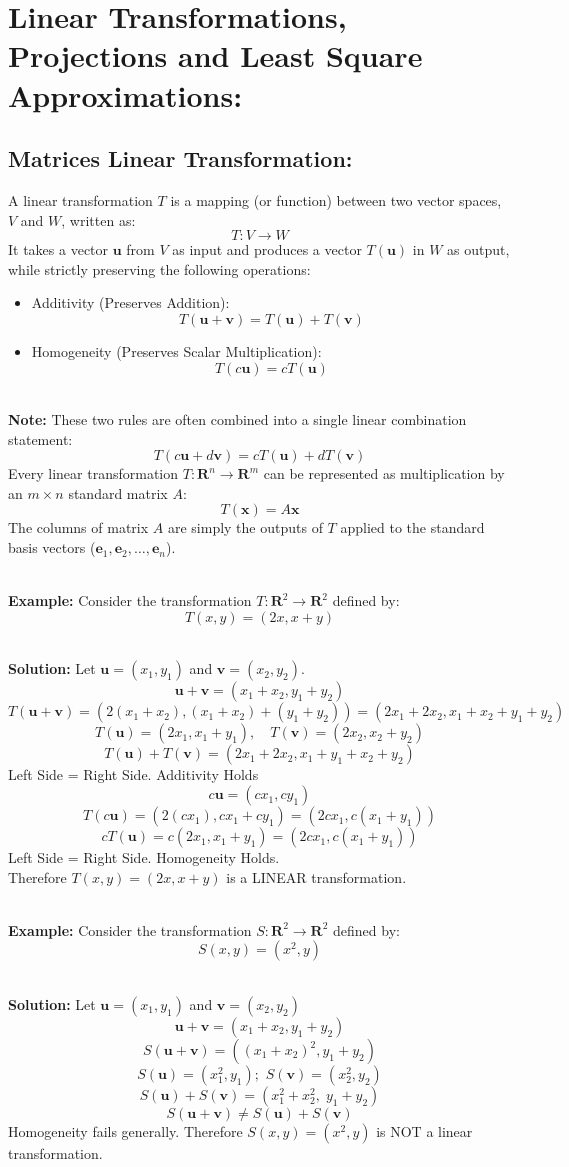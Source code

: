 \documentclass[DIV=20,oneside]{scrartcl}
\newcommand{\note}{
	\noindent\textbf{\\Note: }
}
\newcommand{\solution}{
	\noindent\textbf{\\Solution: }
}
\newcommand{\example}{
	\noindent\textbf{\\Example: }
}
\begin{document}
\section{Linear Transformations, Projections and Least Square Approximations:}
\subsection{Matrices Linear Transformation:} A linear transformation $T$ is a mapping (or function) between two vector spaces, $V$ and $W$, written as:$$T: V \to W$$It takes a vector $\mathbf{u}$ from $V$ as input and produces a vector $T(\mathbf{u})$ in $W$ as output, while strictly preserving the following operations:
\begin{itemize}
	\item Additivity (Preserves Addition):$$T(\mathbf{u} + \mathbf{v}) = T(\mathbf{u}) + T(\mathbf{v})$$
	\item Homogeneity (Preserves Scalar Multiplication):$$T(c\mathbf{u}) = cT(\mathbf{u})$$
\end{itemize}
\note These two rules are often combined into a single linear combination statement:$$T(c\mathbf{u} + d\mathbf{v}) = cT(\mathbf{u}) + dT(\mathbf{v})$$
Every linear transformation $T: \mathbf{R}^n \to \mathbf{R}^m$ can be represented as multiplication by an $m \times n$ standard matrix $A$:$$T(\mathbf{x}) = A\mathbf{x}$$The columns of matrix $A$ are simply the outputs of $T$ applied to the standard basis vectors ($\mathbf{e}_1, \mathbf{e}_2, \dots, \mathbf{e}_n$).

\example Consider the transformation $T: \mathbf{R}^2 \to \mathbf{R}^2$ defined by:$$T(x, y) = (2x, x + y)$$
\solution Let $\mathbf{u} = (x_1, y_1)$ and $\mathbf{v} = (x_2, y_2)$.
$$\mathbf{u} + \mathbf{v} = (x_1 + x_2, y_1 + y_2)$$
$$T(\mathbf{u} + \mathbf{v}) = (2(x_1 + x_2), (x_1 + x_2) + (y_1 + y_2)) = (2x_1 + 2x_2, x_1 + x_2 + y_1 + y_2)$$
$$T(\mathbf{u}) = (2x_1, x_1 + y_1), \quad T(\mathbf{v}) = (2x_2, x_2 + y_2)$$
$$T(\mathbf{u}) + T(\mathbf{v}) = (2x_1 + 2x_2, x_1 + y_1 + x_2 + y_2)$$
Left Side = Right Side. Additivity Holds
$$c\mathbf{u} = (cx_1, cy_1)$$
$$T(c\mathbf{u}) = (2(cx_1), cx_1 + cy_1) = (2cx_1, c(x_1 + y_1))$$
$$cT(\mathbf{u}) = c(2x_1, x_1 + y_1) = (2cx_1, c(x_1 + y_1))$$
Left Side = Right Side. Homogeneity Holds.\\
Therefore $T(x, y) = (2x, x + y)$ is a LINEAR transformation.

\example Consider the transformation $S: \mathbf{R}^2 \to \mathbf{R}^2$ defined by:$$S(x, y) = (x^2, y)$$
\solution Let $\mathbf{u} = (x_1, y_1)$ and $\mathbf{v} = (x_2, y_2)$ 
$$\mathbf{u} + \mathbf{v} = (x_1 + x_2, y_1 + y_2)$$
$$S(\mathbf{u} + \mathbf{v}) = \left( (x_1 + x_2)^2, y_1 + y_2 \right)$$
$$S(\mathbf{u}) = (x_1^2, y_1); \,\,S(\mathbf{v}) = (x_2^2, y_2)$$
$$S(\mathbf{u}) + S(\mathbf{v}) = (x_1^2 + x_2^2, \; y_1 + y_2)$$
$$S(\mathbf{u} + \mathbf{v}) \neq S(\mathbf{u}) + S(\mathbf{v})$$
Homogeneity fails generally.
Therefore $S(x, y) = (x^2, y)$ is NOT a linear transformation.
\end{document}
